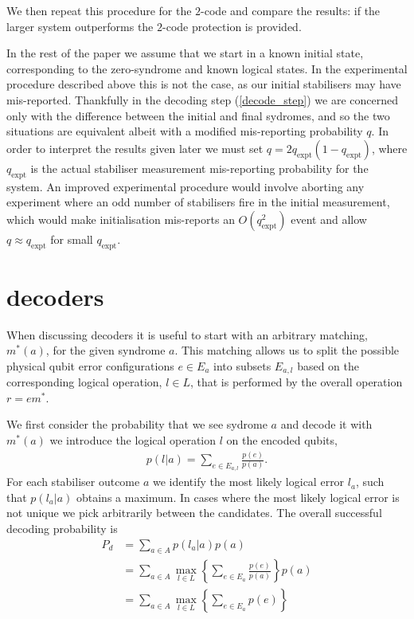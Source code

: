 We then repeat this procedure for the $2$-code and compare the results: if the larger system outperforms the $2$-code protection is provided. 

In the rest of the paper we assume that we start in a known initial state, corresponding to the zero-syndrome and known logical states. In the experimental procedure described above this is not the case, as our initial stabilisers may have mis-reported. Thankfully in the decoding step (\ref{decode_step}) we are concerned only with the difference between the initial and final sydromes, and so the two situations are equivalent albeit with a modified mis-reporting probability $q$. In order to interpret the results given later we must set $q = 2q_\text{expt}(1-q_\text{expt})$, where $q_\text{expt}$ is the actual stabiliser measurement mis-reporting probability for the system. An improved experimental procedure would involve aborting any experiment where an odd number of stabilisers fire in the initial measurement, which would make initialisation mis-reports an $O(q_\text{expt}^2)$ event and allow $q \approx q_\text{expt}$ for small $q_\text{expt}$.

\section{decoders}

When discussing decoders it is useful to start with an arbitrary matching, $m^*(a)$, for the given syndrome $a$. This matching allows us to split the possible physical qubit error configurations $e \in E_a$ into subsets $E_{a,l}$ based on the corresponding logical operation, $l\in L$, that is performed by the overall operation $r = em^*$.

We first consider the probability that we see sydrome $a$ and decode it with $m^*(a)$ we introduce the logical operation $l$ on the encoded qubits,
\begin{align}
  p(l \vert a) = \sum_{e \in E_{a,l}} \frac{p(e)}{p(a)}. 
\end{align}
For each stabiliser outcome $a$ we identify the most likely logical error $l_a$, such that $p(l_a \vert a)$ obtains a maximum. In cases where the most likely logical error is not unique we pick arbitrarily between the candidates. The overall successful decoding probability is 
\begin{align}
  P_d &= \sum_{a \in A} p(l_a \vert a)p(a) \\
  &= \sum_{a \in A} \max_{l\in L} \left\{ \sum_{e \in E_a} \frac{p(e)}{p(a)} \right\} p(a) \\
  &= \sum_{a \in A} \max_{l\in L} \left\{ \sum_{e \in E_a} p(e) \right\} \label{truthful_prob}
\end{align}

